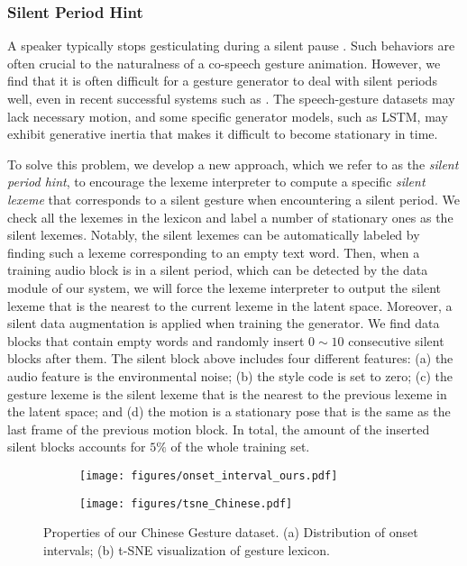 \documentclass[acmtog,authorversion]{acmart}
\begin{document}
\subsubsection{Silent Period Hint}
A speaker typically stops gesticulating during a silent pause \cite{graziano2018silence}. Such behaviors are often crucial to the naturalness of a co-speech gesture animation. However, we find that it is often difficult for a gesture generator to deal with silent periods well, even in recent successful systems such as \cite{alexanderson2020style,kucherenko2020gesticulator}. The speech-gesture datasets may lack necessary motion, and some specific generator models, such as LSTM, may exhibit generative inertia that makes it difficult to become stationary in time.

To solve this problem, we develop a new approach, which we refer to as the \emph{silent period hint}, to encourage the lexeme interpreter to compute a specific \emph{silent lexeme} that corresponds to a silent gesture when encountering a silent period. 
We check all the lexemes in the lexicon and label a number of stationary ones as the silent lexemes. Notably, the silent lexemes can be automatically labeled by finding such a lexeme corresponding to an empty text word. Then, when a training audio block is in a silent period, which can be detected by the data module of our system, we will force the lexeme interpreter to output the silent lexeme that is the nearest to the current lexeme in the latent space.
Moreover, a silent data augmentation is applied when training the generator. We find data blocks that contain empty words and randomly insert $0\sim{}10$ consecutive silent blocks after them. The silent block above includes four different features: (a) the audio feature is the environmental noise; (b) the style code is set to zero; (c) the gesture lexeme is the silent lexeme that is the nearest to the previous lexeme in the latent space; and (d) the motion is a stationary pose that is the same as the last frame of the previous motion block. In total, the amount of the inserted silent blocks accounts for $5\%$ of the whole training set. \begin{figure}[t]
    \centering   
    \begin{subfigure}[t]{0.433\linewidth}
         \centering
         \texttt{[image: figures/onset\_interval\_ours.pdf]}
         \caption{}
         \label{fig:onset_intervals_Chinese}
    \end{subfigure}
    \hspace{0.06\linewidth}
    \begin{subfigure}[t]{0.40\linewidth}
         \centering
         \texttt{[image: figures/tsne\_Chinese.pdf]}
         \caption{}
         \label{fig:lexicon_tsne_Chinese}
    \end{subfigure}
    \caption{Properties of our Chinese Gesture dataset. (a) Distribution of onset intervals; (b) t-SNE visualization of gesture lexicon.} 
    \Description{}
\end{figure}
\end{document}
